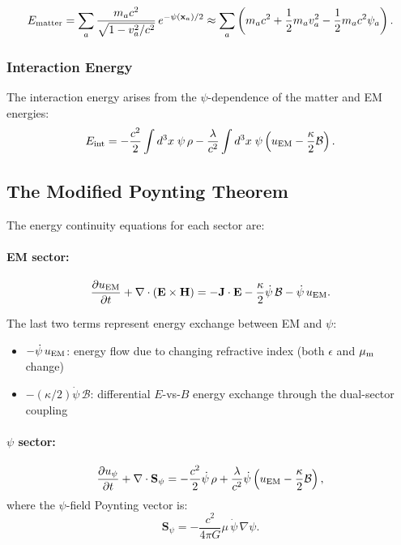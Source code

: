 \documentclass[aps,prd,twocolumn,superscriptaddress,floatfix,nofootinbib]{revtex4-2}
\newcommand{\mufunction}{\mu}
\newcommand{\lam}{\lambda}
\newcommand{\kap}{\kappa}
\newcommand{\calB}{\mathcal{B}}
\begin{document}
\begin{equation}
E_{\rm matter} = \sum_a \frac{m_a c^2}{\sqrt{1-v_a^2/c^2}}\,
e^{-\psi(\mathbf{x}_a)/2}
\approx \sum_a \left(m_a c^2 + \frac{1}{2}m_a v_a^2
- \frac{1}{2}m_a c^2\psi_a\right).
\label{eq:E-matter}
\end{equation}

\subsubsection{Interaction Energy}

The interaction energy arises from the $\psi$-dependence of the
matter and EM energies:
\begin{equation}
E_{\rm int} = -\frac{c^2}{2}\int d^3x\;\psi\,\rho
- \frac{\lam}{c^2}\int d^3x\;\psi\left(
u_{\rm EM} - \frac{\kap}{2}\calB\right).
\label{eq:E-int}
\end{equation}

\subsection{The Modified Poynting Theorem}\label{sec:poynting}

The energy continuity equations for each sector are:

\paragraph{EM sector:}
\begin{equation}
\frac{\partial u_{\rm EM}}{\partial t}
+ \nabla\cdot(\mathbf{E}\times\mathbf{H})
= -\mathbf{J}\cdot\mathbf{E}
- \frac{\kap}{2}\dot\psi\,\calB
- \dot\psi\,u_{\rm EM}.
\label{eq:poynting-EM}
\end{equation}

The last two terms represent energy exchange between EM and $\psi$:
\begin{itemize}[nosep]
\item $-\dot\psi\,u_{\rm EM}$: energy flow due to changing refractive
index (both $\epsilon$ and $\mu_{\rm m}$ change)
\item $-(\kap/2)\dot\psi\,\calB$: differential $E$-vs-$B$ energy
exchange through the dual-sector coupling
\end{itemize}

\paragraph{$\psi$ sector:}
\begin{equation}
\frac{\partial u_\psi}{\partial t}
+ \nabla\cdot\mathbf{S}_\psi
= -\frac{c^2}{2}\dot\psi\,\rho
+ \frac{\lam}{c^2}\dot\psi\left(u_{\rm EM} - \frac{\kap}{2}\calB\right),
\label{eq:poynting-psi}
\end{equation}
where the $\psi$-field Poynting vector is:
\begin{equation}
\mathbf{S}_\psi = -\frac{c^2}{4\pi G}\mufunction\,\dot\psi\,\nabla\psi.
\label{eq:S-psi-poynting}
\end{equation}
\end{document}
